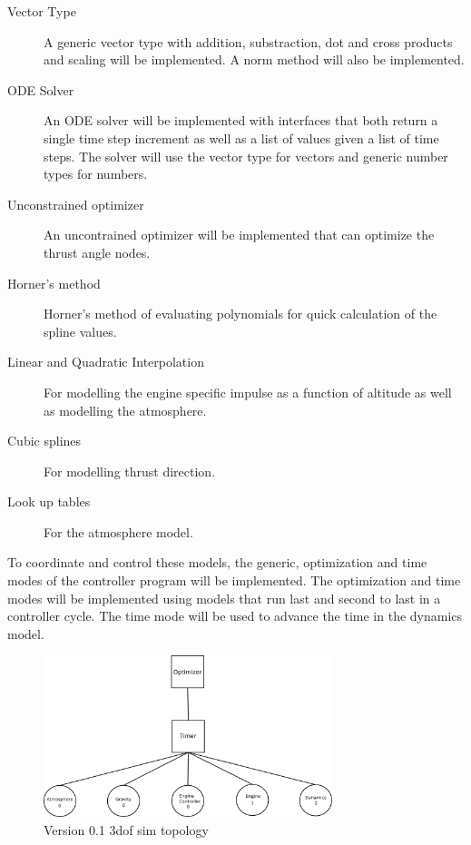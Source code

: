 \documentclass{article}
\begin{document}
\begin{description}
	\item[Vector Type] A generic vector type with addition, substraction, dot and cross products and scaling will be implemented. A norm method will also be implemented.
	\item[ODE Solver] An ODE solver will be implemented with interfaces that both return a single time step increment as well as a list of values given a list of time steps. The solver will use the vector type for vectors and generic number types for numbers.
	\item[Unconstrained optimizer] An uncontrained optimizer will be implemented that can optimize the thrust angle nodes.
	\item[Horner's method] Horner's method of evaluating polynomials for quick calculation of the spline values.
	\item[Linear and Quadratic Interpolation] For modelling the engine specific impulse as a function of altitude as well as modelling the atmosphere.
	\item[Cubic splines] For modelling thrust direction.
	\item[Look up tables] For the atmosphere model. 
\end{description}
To coordinate and control these models, the generic, optimization and time modes of the controller program will be implemented. The optimization and time modes will be implemented using models that run last and second to last in a controller cycle. The time mode will be used to advance the time in the dynamics model.

\begin{figure}[h]
\begin{center}
\leavevmode
\includegraphics[width=0.75\textwidth]{01layout.pdf}
\end{center}
\caption{Version 0.1 3dof sim topology}
\label{01layout}
\end{figure}
\end{document}
